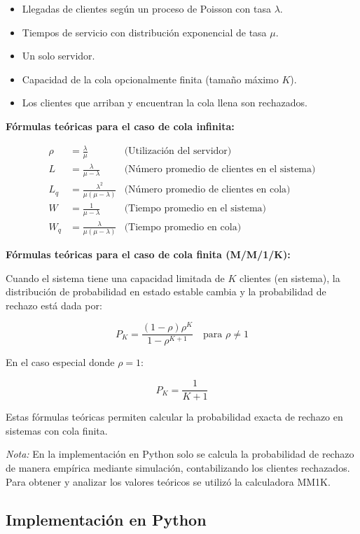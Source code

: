 \documentclass[12pt]{article}
\begin{document}
\begin{itemize}
    \item Llegadas de clientes según un proceso de Poisson con tasa $\lambda$.
    \item Tiempos de servicio con distribución exponencial de tasa $\mu$.
    \item Un solo servidor.
    \item Capacidad de la cola opcionalmente finita (tamaño máximo $K$).
    \item Los clientes que arriban y encuentran la cola llena son rechazados.
\end{itemize}

\textbf{Fórmulas teóricas para el caso de cola infinita:}

\begin{align*}
\rho &= \frac{\lambda}{\mu} & \text{(Utilización del servidor)} \\
L &= \frac{\lambda}{\mu - \lambda} & \text{(Número promedio de clientes en el sistema)} \\
L_q &= \frac{\lambda^2}{\mu(\mu - \lambda)} & \text{(Número promedio de clientes en cola)} \\
W &= \frac{1}{\mu - \lambda} & \text{(Tiempo promedio en el sistema)} \\
W_q &= \frac{\lambda}{\mu(\mu - \lambda)} & \text{(Tiempo promedio en cola)}
\end{align*}

\vspace{0.5em}
\textbf{Fórmulas teóricas para el caso de cola finita (M/M/1/K):}

Cuando el sistema tiene una capacidad limitada de $K$ clientes (en sistema), la distribución de probabilidad en estado estable cambia y la probabilidad de rechazo está dada por:

\[
P_K = \frac{(1 - \rho) \rho^K}{1 - \rho^{K+1}} \quad \text{para } \rho \neq 1
\]

En el caso especial donde $\rho = 1$:

\[
P_K = \frac{1}{K + 1}
\]

Estas fórmulas teóricas permiten calcular la probabilidad exacta de rechazo en sistemas con cola finita. 

\textit{Nota:} En la implementación en Python solo se calcula la probabilidad de rechazo de manera empírica mediante simulación, contabilizando los clientes rechazados. Para obtener y analizar los valores teóricos se utilizó la calculadora MM1K.


\subsection{Implementación en Python}
\end{document}

